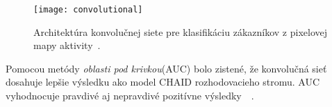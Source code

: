 \begin{figure}[H]
\begin{center}
\texttt{[image: convolutional]}
\caption[convolutional]{Architektúra konvolučnej siete pre klasifikáciu zákazníkov z pixelovej mapy aktivity~\cite{wangperawong2016churn}.}
\label{fig:convolutional}
\end{center}
\end{figure}

Pomocou metódy \textit{oblasti pod krivkou}(AUC) bolo zistené, že konvolučná sieť dosahuje lepšie výsledku ako model CHAID rozhodovacieho stromu. AUC vyhodnocuje pravdivé aj nepravdivé pozitívne výsledky~\cite{hanley1982meaning}~\cite{bradley1997use}.

